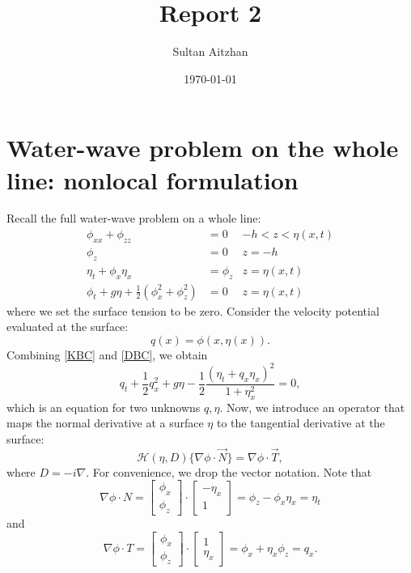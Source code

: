 \documentclass[10pt,reqno,oneside,a4paper]{article}
\author{Sultan Aitzhan}
\title{Report 2}
\date{\today}
\begin{document}
\maketitle
\thispagestyle{fancy}
\tableofcontents


\section{Water-wave problem on the whole line: nonlocal formulation}

Recall the full water-wave problem on a whole line:
\begin{subequations} \label{DimWholeLineProblem}
\begin{align}
\phi_{xx} + \phi_{zz} &= 0 &-h < z < \eta(x,t) \label{PDE}\\
\phi_{z} &= 0 &z = -h \label{BBC}\\
\eta_t + \phi_{x}\eta_{x} &= \phi_{z} & z = \eta(x,t) \label{KBC}\\
\phi_t + g\eta + \frac{1}{2}(\phi_{x}^2 + \phi_{z}^2) &= 0 &z = \eta(x,t) \label{DBC}
\end{align}
\end{subequations}
where we set the surface tension to be zero. Consider the velocity potential evaluated at the surface:
\[ 
q(x) = \phi (x, \eta(x)).
\]
Combining \eqref{KBC} and \eqref{DBC}, we obtain 
\begin{equation}\label{qEq1}
q_t + \frac{1}{2}q_x^2 + g \eta - \frac{1}{2} \frac{(\eta_t + q_x \eta_x)^2}{1 + \eta_x^2} = 0,
\end{equation}
which is an equation for two unknowns $q ,\eta.$ Now, we introduce an operator that maps the normal derivative at a surface $\eta$ to the tangential derivative at the surface:
\begin{equation}\label{defH1}
\mathcal{H}(\eta, D) \{ \nabla \phi \cdot \vec{N} \} = \nabla \phi \cdot \vec{T},
\end{equation}
where $D = - i \nabla.$ For convenience, we drop the vector notation. Note that
\[ 
\nabla \phi \cdot N = \begin{bmatrix} \phi_x \\ \phi_z \end{bmatrix} \cdot \begin{bmatrix} -\eta_x \\ 1 \end{bmatrix} = \phi_z - \phi_x \eta_x = \eta_t
\] 
and 
\[ 
\nabla \phi \cdot T = \begin{bmatrix} \phi_x \\ \phi_z \end{bmatrix} \cdot \begin{bmatrix} 1 \\ \eta_x \end{bmatrix} = \phi_x + \eta_x \phi_z = q_x.
\]
\end{document}
